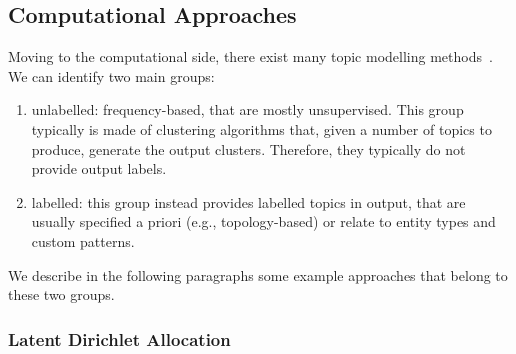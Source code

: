 



\subsection{\statusgreen Computational Approaches}
\label{sec:lit_topics_computation}

Moving to the computational side, there exist many topic modelling methods~\citep{vayansky2020review,ramage2009topic,churchill2022evolution,kherwa2019topic}.
We can identify two main groups:
\begin{enumerate}
    \item unlabelled: frequency-based, that are mostly unsupervised. This group typically is made of clustering algorithms that, given a number of topics to produce, generate the output clusters. Therefore, they typically do not provide output labels. %
    \item labelled: this group instead provides labelled topics in output, that are usually specified a priori (e.g., topology-based) or relate to entity types and custom patterns.
\end{enumerate}





We describe in the following paragraphs some example approaches that belong to these two groups.


\subsubsection{Latent Dirichlet Allocation}


